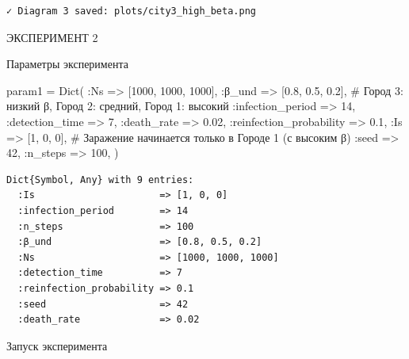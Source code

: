 \documentclass[
  12pt,
  a4paper,
  DIV=11,
  numbers=noendperiod]{scrreprt}
\newenvironment{Shaded}{\begin{snugshade}}{\end{snugshade}}
\newcommand{\CommentTok}[1]{\textcolor[rgb]{0.37,0.37,0.37}{#1}}
\newcommand{\FloatTok}[1]{\textcolor[rgb]{0.68,0.00,0.00}{#1}}
\newcommand{\FunctionTok}[1]{\textcolor[rgb]{0.28,0.35,0.67}{#1}}
\newcommand{\NormalTok}[1]{\textcolor[rgb]{0.00,0.23,0.31}{#1}}
\newcommand{\OperatorTok}[1]{\textcolor[rgb]{0.37,0.37,0.37}{#1}}
\begin{document}


\begin{verbatim}
✓ Diagram 3 saved: plots/city3_high_beta.png
\end{verbatim}

ЭКСПЕРИМЕНТ 2

Параметры эксперимента

\begin{Shaded}
\begin{Highlighting}[]
\NormalTok{param1 }\OperatorTok{=} \FunctionTok{Dict}\NormalTok{(}
    \OperatorTok{:}\NormalTok{Ns }\OperatorTok{=\textgreater{}}\NormalTok{ [}\FloatTok{1000}\NormalTok{, }\FloatTok{1000}\NormalTok{, }\FloatTok{1000}\NormalTok{],}
    \OperatorTok{:}\NormalTok{β\_und }\OperatorTok{=\textgreater{}}\NormalTok{ [}\FloatTok{0.8}\NormalTok{, }\FloatTok{0.5}\NormalTok{, }\FloatTok{0.2}\NormalTok{],  }\CommentTok{\# Город 3: низкий β, Город 2: средний, Город 1: высокий}
    \OperatorTok{:}\NormalTok{infection\_period }\OperatorTok{=\textgreater{}} \FloatTok{14}\NormalTok{,}
    \OperatorTok{:}\NormalTok{detection\_time }\OperatorTok{=\textgreater{}} \FloatTok{7}\NormalTok{,}
    \OperatorTok{:}\NormalTok{death\_rate }\OperatorTok{=\textgreater{}} \FloatTok{0.02}\NormalTok{,}
    \OperatorTok{:}\NormalTok{reinfection\_probability }\OperatorTok{=\textgreater{}} \FloatTok{0.1}\NormalTok{,}
    \OperatorTok{:}\NormalTok{Is }\OperatorTok{=\textgreater{}}\NormalTok{ [}\FloatTok{1}\NormalTok{, }\FloatTok{0}\NormalTok{, }\FloatTok{0}\NormalTok{],  }\CommentTok{\# Заражение начинается только в Городе 1 (с высоким β)}
    \OperatorTok{:}\NormalTok{seed }\OperatorTok{=\textgreater{}} \FloatTok{42}\NormalTok{,}
    \OperatorTok{:}\NormalTok{n\_steps }\OperatorTok{=\textgreater{}} \FloatTok{100}\NormalTok{,}
\NormalTok{)}
\end{Highlighting}
\end{Shaded}

\begin{verbatim}
Dict{Symbol, Any} with 9 entries:
  :Is                      => [1, 0, 0]
  :infection_period        => 14
  :n_steps                 => 100
  :β_und                   => [0.8, 0.5, 0.2]
  :Ns                      => [1000, 1000, 1000]
  :detection_time          => 7
  :reinfection_probability => 0.1
  :seed                    => 42
  :death_rate              => 0.02
\end{verbatim}

Запуск эксперимента
\end{document}

